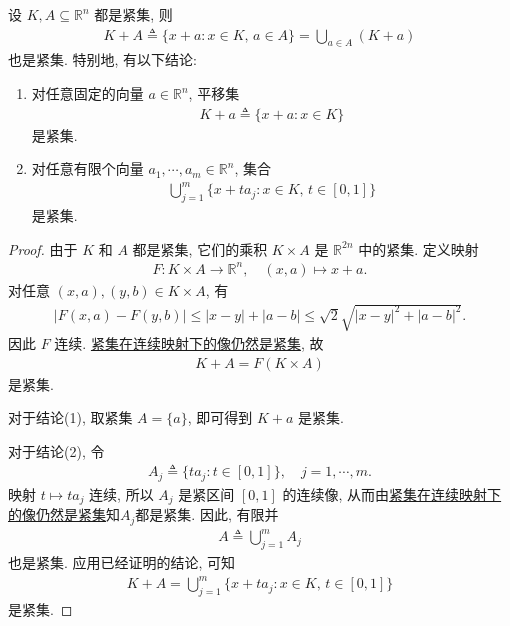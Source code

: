 \documentclass[../../main.tex]{subfiles}
\begin{document}
\begin{proposition}[紧集平移的紧性]\label{proposition:紧集平移与紧参数平移集}
设 $K,A\subseteq\mathbb{R}^n$ 都是紧集, 则
\begin{align*}
K+A
\triangleq
\{x+a:x\in K,\, a\in A\}
=
\bigcup\limits_{a\in A}(K+a)
\end{align*}
也是紧集.
特别地, 有以下结论:
\begin{enumerate}[(1)]
\item 对任意固定的向量 $a\in\mathbb{R}^n$, 平移集
\begin{align*}
K+a\triangleq\{x+a:x\in K\}
\end{align*}
是紧集.
\item 对任意有限个向量 $a_1,\cdots,a_m\in\mathbb{R}^n$, 集合
\begin{align*}
\bigcup\limits_{j=1}^m
\{x+ta_j:x\in K,\, t\in[0,1]\}
\end{align*}
是紧集.
\end{enumerate}
\end{proposition}
\begin{proof}
由于 $K$ 和 $A$ 都是紧集, 它们的乘积 $K\times A$ 是 $\mathbb{R}^{2n}$ 中的紧集.
定义映射
\begin{align*}
F:K\times A\longrightarrow\mathbb{R}^n,\quad
(x,a)\longmapsto x+a.
\end{align*}
对任意 $(x,a),(y,b)\in K\times A$, 有
\begin{align*}
|F(x,a)-F(y,b)|
\leqslant |x-y|+|a-b|\leqslant
\sqrt{2}\sqrt{|x-y|^2+|a-b|^2}.
\end{align*}
因此 $F$ 连续.
\hyperref[Topology-theorem:topology-紧集的连续像是紧集]{紧集在连续映射下的像仍然是紧集}, 故
\begin{align*}
K+A=F(K\times A)
\end{align*}
是紧集.

对于结论(1), 取紧集 $A=\{a\}$, 即可得到 $K+a$ 是紧集.

对于结论(2), 令
\begin{align*}
A_j\triangleq\{ta_j:t\in[0,1]\},
\quad j=1,\cdots,m.
\end{align*}
映射 $t\mapsto ta_j$ 连续, 所以 $A_j$ 是紧区间 $[0,1]$ 的连续像, 从而由\hyperref[Topology-theorem:topology-紧集的连续像是紧集]{紧集在连续映射下的像仍然是紧集}知$A_j$都是紧集.
因此, 有限并
\begin{align*}
A\triangleq\bigcup\limits_{j=1}^m A_j
\end{align*}
也是紧集.
应用已经证明的结论, 可知
\begin{align*}
K+A
=
\bigcup\limits_{j=1}^m
\{x+ta_j:x\in K,\, t\in[0,1]\}
\end{align*}
是紧集.
\end{proof}
\end{document}
